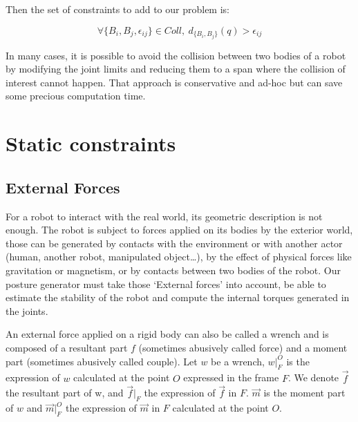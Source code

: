 Then the set of constraints to add to our problem is:

\begin{equation}
  \boxed{\forall \{B_i, B_j, \epsilon_{ij}\} \in Coll,\ d_{\{B_i, B_j\}}(q) > \epsilon_{ij}}
\end{equation}

In many cases, it is possible to avoid the collision between two bodies of a robot by modifying the joint limits and reducing them to a span where the collision of interest cannot happen. That approach is conservative and ad-hoc but can save some precious computation time.



\section{Static constraints}
\label{sec:static_constraints}


\subsection{External Forces}
\label{sub:external_forces}


For a robot to interact with the real world, its geometric description is not enough.
The robot is subject to forces applied on its bodies by the exterior world, those can be generated by contacts with the environment or with another actor (human, another robot, manipulated object\ldots), by the effect of physical forces like gravitation or magnetism, or by contacts between two bodies of the robot.
Our posture generator must take those `External forces' into account, be able to estimate the stability of the robot and compute the internal torques generated in the joints.

An external force applied on a rigid body can also be called a wrench and is composed of a resultant part $f$ (sometimes abusively called force) and a moment part (sometimes abusively called couple).
Let $w$ be a wrench, $w|_F^O$ is the expression of $w$ calculated at the point $O$ expressed in the frame $F$.
We denote $\vec{f}$ the resultant part of w, and $\vec{f}|_F$ the expression of $\vec{f}$ in $F$.
$\vec{m}$ is the moment part of $w$ and $\vec{m}|_F^O$ the expression of $\vec{m}$ in $F$ calculated at the point $O$.

